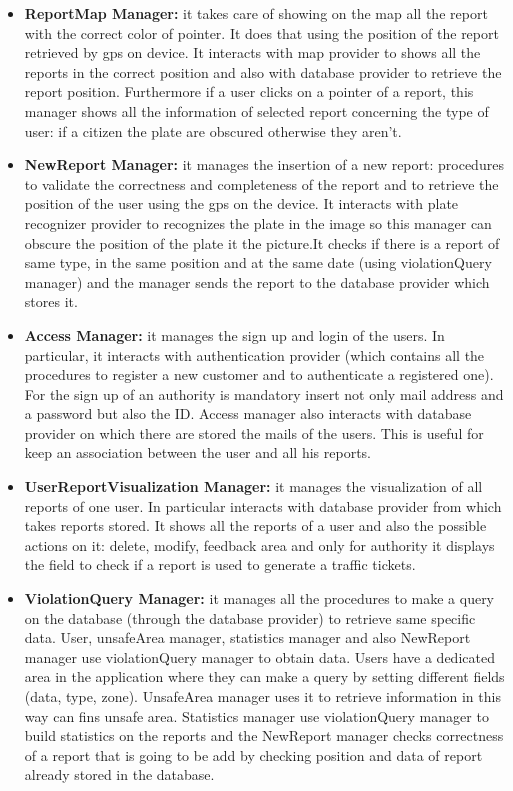 \documentclass[../RASD.tex]{subfiles}
\begin{document}
    \begin{itemize}
        \item \textbf{ReportMap Manager:} it takes care of showing on the map all the report with the correct color of pointer. It does that using the position of the report retrieved by gps on device. It interacts with map provider to shows all the reports in the correct position and also with database provider to retrieve the report position. Furthermore if a user clicks on a pointer of a report, this manager shows all the information of selected report concerning the type of user: if a citizen the plate are obscured otherwise they aren’t.
        \item \textbf{NewReport Manager:} it manages the insertion of a new report: procedures to validate the correctness and completeness of the report and to retrieve the position of the user using the gps on the device. It interacts with plate recognizer provider to recognizes the plate in the image so this manager can obscure the position of the plate it the picture.It checks if there is a report of same type, in the same position and at the same date (using violationQuery manager) and the manager sends the report to the database provider which stores it.
        \item \textbf{Access Manager:} it manages the sign up and login of the users. In particular, it interacts with authentication provider (which contains all the procedures to register a new customer and to authenticate a registered one). For the sign up of an authority is mandatory insert not only mail address and a password but also the ID. Access manager also interacts with database provider on which there are stored the mails of the users. This is useful for keep an association between the user and all his reports.
        \item \textbf{UserReportVisualization Manager:} it manages the visualization of all reports of one user. In particular interacts with database provider from which takes reports stored. It shows all the reports of a user and also the possible actions on it: delete, modify, feedback area and only for authority it displays the field to check if a report is used to generate a traffic tickets.
        \item \textbf{ViolationQuery Manager:} it manages all the procedures to make a query on the database (through the database provider) to retrieve same specific data. User, unsafeArea manager, statistics manager and also NewReport manager use violationQuery manager to obtain data. Users have a dedicated area in the application where they can make a query by setting different fields (data, type, zone). UnsafeArea manager uses it to retrieve information in this way can fins unsafe area. Statistics manager use violationQuery manager to build statistics on the reports and the NewReport manager checks correctness of a report that is going to be add by checking position and data of report already stored in the database.

\end{itemize}
\end{document}

